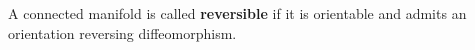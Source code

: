 A connected manifold is called \textbf{reversible} if it is orientable and admits an orientation reversing diffeomorphism.
